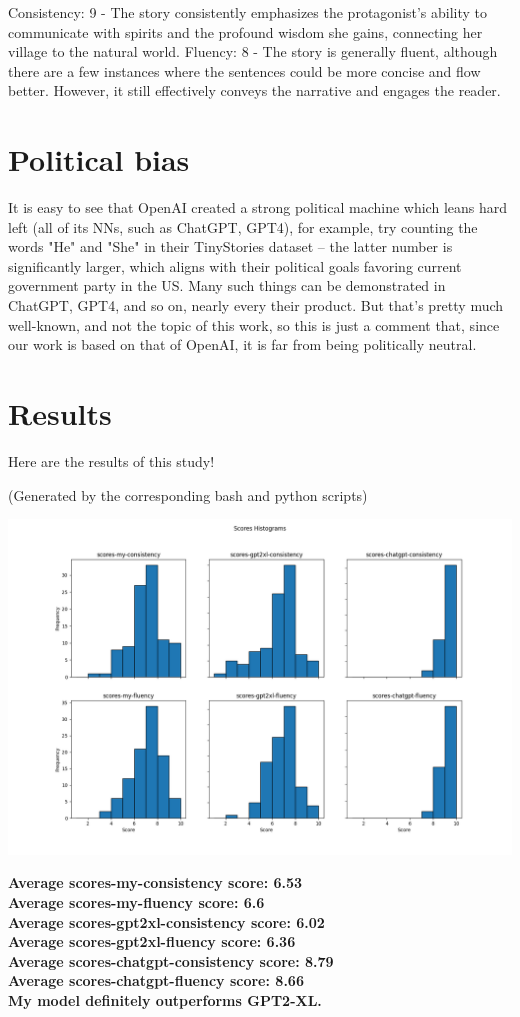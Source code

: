 \documentclass{article}
\begin{document}
Consistency: 9 - The story consistently emphasizes the protagonist's ability to communicate with spirits and the profound wisdom she gains, connecting her village to the natural world.
Fluency: 8 - The story is generally fluent, although there are a few instances where the sentences could be more concise and flow better. However, it still effectively conveys the narrative and engages the reader.


\section{Political bias}


It is easy to see that OpenAI created a strong political machine which leans hard left (all of its NNs, such as ChatGPT, GPT4), for example, try counting the words "He" and "She" in their TinyStories dataset -- the latter number is significantly larger, which aligns with their political goals favoring current government party in the US. Many such things can be demonstrated in ChatGPT, GPT4, and so on, nearly every their product. But that's pretty much well-known, and not the topic of this work, so this is just a comment that, since our work is based on that of OpenAI, it is far from being politically neutral.


\clearpage
\section{Results}


Here are the results of this study!

(Generated by the corresponding bash and python scripts)

\includegraphics[width=500pt]{bar-hists.png}

\textbf{Average scores-my-consistency score: 6.53}\\
\textbf{Average scores-my-fluency score: 6.6}\\
\textbf{Average scores-gpt2xl-consistency score: 6.02}\\
\textbf{Average scores-gpt2xl-fluency score: 6.36}\\
\textbf{Average scores-chatgpt-consistency score: 8.79}\\
\textbf{Average scores-chatgpt-fluency score: 8.66}\\

\textbf{\large My model definitely outperforms GPT2-XL.}
\end{document}
